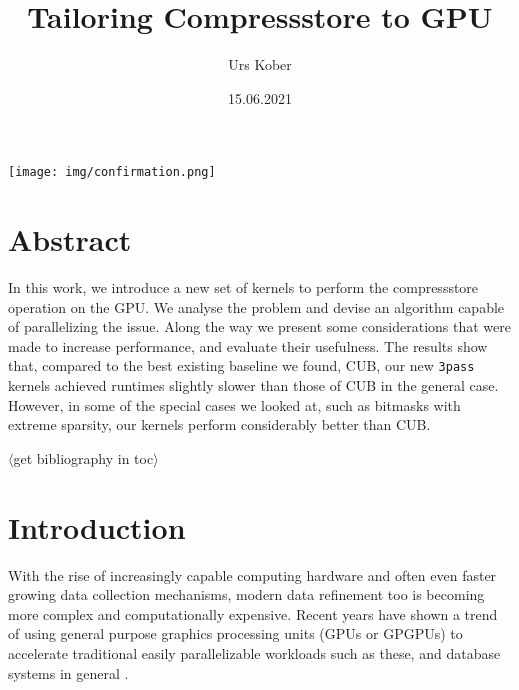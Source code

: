 \documentclass{tudscrreprt}
\newcommand{\markr}[1]{\textcolor{review}{$\langle$#1$\rangle$}}
\begin{document}
	
	\date{15.06.2021}
	\title{Tailoring Compressstore to GPU}
	 
	\author{ Urs Kober
		\matriculationnumber{---}
		\placeofbirth{---}
	}
	\maketitle
	
	\vspace*{5cm}
	\texttt{[image: img/confirmation.png]}
	\thispagestyle{empty}
	\newpage
	
	\chapter*{Abstract}
		In this work, we introduce a new set of kernels to perform the compressstore operation on the GPU. We analyse the problem and devise an algorithm capable of parallelizing the issue. Along the way we present some considerations that were made to increase performance, and evaluate their usefulness. The results show that, compared to the best existing baseline we found, CUB, our new \texttt{3pass} kernels achieved runtimes slightly slower than those of CUB in the general case. However, in some of the special cases we looked at, such as bitmasks with extreme sparsity, our kernels perform considerably better than CUB.
	
	\tableofcontents
	
	\markr{get bibliography in toc}
	
	\chapter{Introduction}
		With the rise of increasingly capable computing hardware and often even faster growing data collection mechanisms, modern data refinement too is becoming more complex and computationally expensive. Recent years have shown a trend of using general purpose graphics processing units (GPUs or GPGPUs) to accelerate traditional easily parallelizable workloads such as these, and database systems in general \cite{gpgpu_sql, gpgpu_db, gpgpu_cuda}. \\
		
\end{document}
